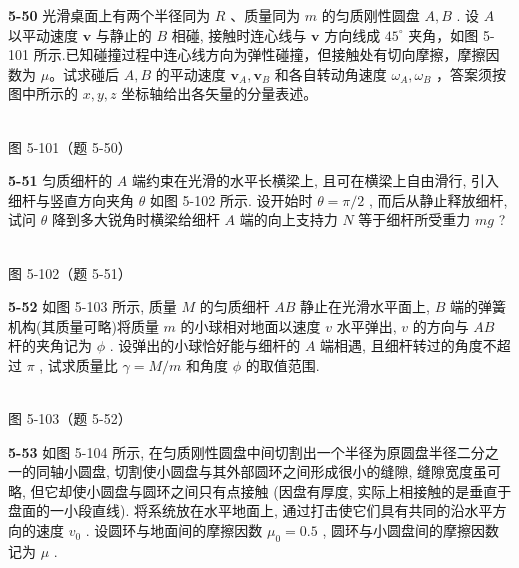 \textbf{5-50} 光滑桌面上有两个半径同为 $R$ 、质量同为 $m$ 的匀质刚性圆盘 $A, B$ . 设 $A$ 以平动速度 $\pmb{v}$ 与静止的 $B$ 相碰, 接触时连心线与 $\pmb{v}$ 方向线成 $45^{\circ}$ 夹角，如图 5-101 所示.已知碰撞过程中连心线方向为弹性碰撞，但接触处有切向摩擦，摩擦因数为 $\mu$。试求碰后 $A,B$ 的平动速度 $\pmb{v}_A,\pmb{v}_B$ 和各自转动角速度 $\omega_{A},\omega_{B}$ ，答案须按图中所示的 $x,y,z$ 坐标轴给出各矢量的分量表述。

\begin{center}
\resizebox{0.47\textwidth}{!}{}\\[4pt]
{\small 图 5-101（题 5-50）}
\end{center}

\newpage

\textbf{5-51} 匀质细杆的 $A$ 端约束在光滑的水平长横梁上, 且可在横梁上自由滑行, 引入细杆与竖直方向夹角 $\theta$ 如图 5-102 所示. 设开始时 $\theta = \pi / 2$ , 而后从静止释放细杆, 试问 $\theta$ 降到多大锐角时横梁给细杆 $A$ 端的向上支持力 $N$ 等于细杆所受重力 $mg$ ?

\begin{center}
\resizebox{0.50\textwidth}{!}{}\\[4pt]
{\small 图 5-102（题 5-51）}
\end{center}

\newpage

\textbf{5-52} 如图 5-103 所示, 质量 $M$ 的匀质细杆 $AB$ 静止在光滑水平面上, $B$ 端的弹簧机构(其质量可略)将质量 $m$ 的小球相对地面以速度 $v$ 水平弹出, $v$ 的方向与 $AB$ 杆的夹角记为 $\phi$ . 设弹出的小球恰好能与细杆的 $A$ 端相遇, 且细杆转过的角度不超过 $\pi$ , 试求质量比 $\gamma = M/m$ 和角度 $\phi$ 的取值范围.

\begin{center}
\resizebox{0.50\textwidth}{!}{}\\[4pt]
{\small 图 5-103（题 5-52）}
\end{center}

\newpage

\textbf{5-53} 如图 5-104 所示, 在匀质刚性圆盘中间切割出一个半径为原圆盘半径二分之一的同轴小圆盘, 切割使小圆盘与其外部圆环之间形成很小的缝隙, 缝隙宽度虽可略, 但它却使小圆盘与圆环之间只有点接触 (因盘有厚度, 实际上相接触的是垂直于盘面的一小段直线). 将系统放在水平地面上, 通过打击使它们具有共同的沿水平方向的速度 $v_{0}$ . 设圆环与地面间的摩擦因数 $\mu_{0} = 0.5$ , 圆环与小圆盘间的摩擦因数记为 $\mu$ .

